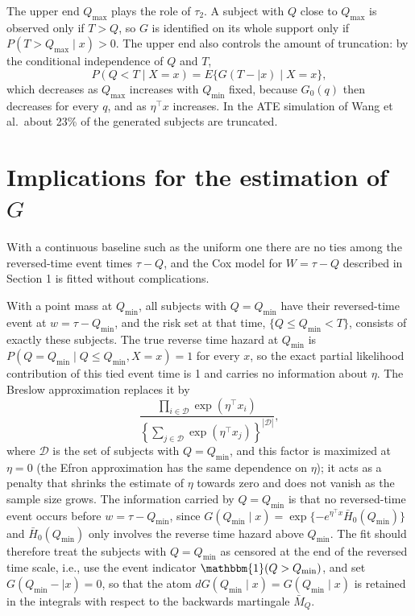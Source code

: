 \documentclass[11pt]{article}
\newcommand{\Qmin}{Q_{\min}}
\newcommand{\Qmax}{Q_{\max}}
\begin{document}
The upper end $\Qmax$ plays the role of $\tau_2$. A subject with $Q$ close to $\Qmax$ is
observed only if $T > Q$, so $G$ is identified on its whole support only if
$P(T > \Qmax \mid x) > 0$. The upper end also controls the amount of truncation: by the
conditional independence of $Q$ and $T$,
\begin{equation*}
P(Q < T \mid X = x) = E\{G(T- \mid x) \mid X = x\},
\end{equation*}
which decreases as $\Qmax$ increases with $\Qmin$ fixed, because $G_0(q)$ then decreases
for every $q$, and as $\eta^\top x$ increases. In the ATE simulation of Wang et al.\ about
23\% of the generated subjects are truncated.

\section{Implications for the estimation of \texorpdfstring{$G$}{G}}

With a continuous baseline such as the uniform one there are no ties among the
reversed-time event times $\tau - Q$, and the Cox model for $W = \tau - Q$ described in
Section 1 is fitted without complications.

With a point mass at $\Qmin$, all subjects with $Q = \Qmin$ have their reversed-time event
at $w = \tau - \Qmin$, and the risk set at that time, $\{Q \le \Qmin < T\}$, consists of
exactly these subjects. The true reverse time hazard at $\Qmin$ is
$P(Q = \Qmin \mid Q \le \Qmin, X = x) = 1$ for every $x$, so the exact partial likelihood
contribution of this tied event time is 1 and carries no information about $\eta$.
The Breslow approximation replaces it by
\begin{equation*}
\frac{\prod_{i \in \mathcal{D}} \exp(\eta^\top x_i)}
{\left\{\sum_{j \in \mathcal{D}} \exp(\eta^\top x_j)\right\}^{|\mathcal{D}|}},
\end{equation*}
where $\mathcal{D}$ is the set of subjects with $Q = \Qmin$, and this factor is maximized
at $\eta = 0$ (the Efron approximation has the same dependence on $\eta$); it acts as a
penalty that shrinks the estimate of $\eta$ towards zero and does not vanish as the sample
size grows. The information carried by $Q = \Qmin$ is that no reversed-time event occurs
before $w = \tau - \Qmin$, since $G(\Qmin \mid x) = \exp\{-e^{\eta^\top x}\bar H_0(\Qmin)\}$
and $\bar H_0(\Qmin)$ only involves the reverse time hazard above $\Qmin$. The fit should
therefore treat the subjects with $Q = \Qmin$ as censored at the end of the reversed time
scale, i.e., use the event indicator $\mathbbm{1}(Q > \Qmin)$, and set
$G(\Qmin- \mid x) = 0$, so that the atom $dG(\Qmin \mid x) = G(\Qmin \mid x)$ is retained
in the integrals with respect to the backwards martingale $\bar M_Q$.



\end{document}
